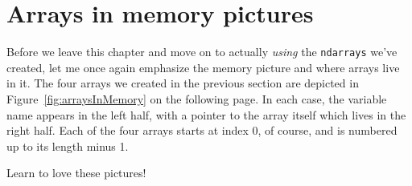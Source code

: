 \section{Arrays in memory pictures}


Before we leave this chapter and move on to actually \textit{using} the
\texttt{ndarrays} we've created, let me once again emphasize the memory picture
and where arrays live in it. The four arrays we created in the previous section
are depicted in Figure~\ref{fig:arraysInMemory} on the following page. In each
case, the variable name appears in the left half, with a pointer to the array
itself which lives in the right half. Each of the four arrays starts at index
0, of course, and is numbered up to its length minus 1.

Learn to love these pictures!
